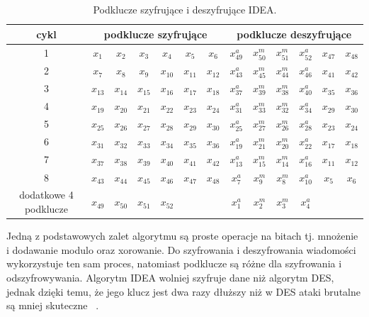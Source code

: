 \documentclass[12p]{article}
\begin{document}
\begin{table}[H]
\centering
\begin{tabular}{|c|c|c|c|c|c|c|c|c|c|c|c|c|}
\hline
cykl & \multicolumn{6}{|c|}{podklucze szyfrujące}  & \multicolumn{6}{|c|}{podklucze deszyfrujące} \\ \hline
1&$x_{1}$&$x_{2}$&$x_{3}$&$x_{4}$&$x_{5}$&$x_{6}$&$x_{49}^{a}$&$x_{50}^{m}$&$x_{51}^{m}$&$x_{52}^{a}$&$x_{47}$&$x_{48}$\\ \hline
2&$x_{7}$&$x_{8}$&$x_{9}$&$x_{10}$&$x_{11}$& $x_{12}$&$x_{43}^{a}$&$x_{45}^{m}$&$x_{44}^{m}$&$x_{46}^{a}$&$x_{41}$&$x_{42}$\\ \hline
3&$x_{13}$&$x_{14}$&$x_{15}$&$x_{16}$&$x_{17}$&$x_{18}$&$x_{37}^{a}$&$x_{39}^{m}$&$x_{38}^{m}$&$x_{40}^{a}$&$x_{35}$&$x_{36}$\\ \hline
4&$x_{19}$&$x_{20}$&$x_{21}$&$x_{22}$&$x_{23}$&$x_{24}$&$x_{31}^{a}$&$x_{33}^{m}$&$x_{32}^{m}$&$x_{34}^{a}$&$x_{29}$&$x_{30}$\\ \hline
5&$x_{25}$&$x_{26}$&$x_{27}$&$x_{28}$&$x_{29}$&$x_{30}$&$x_{25}^{a}$&$x_{27}^{m}$&$x_{26}^{m}$&$x_{28}^{a}$&$x_{23}$&$x_{24}$\\ \hline
6&$x_{31}$&$x_{32}$&$x_{33}$&$x_{34}$&$x_{35}$&$x_{36}$&$x_{19}^{a}$&$x_{21}^{m}$&$x_{20}^{m}$&$x_{22}^{a}$&$x_{17}$&$x_{18}$\\ \hline
7&$x_{37}$&$x_{38}$&$x_{39}$&$x_{40}$&$x_{41}$&$x_{42}$&$x_{13}^{a}$&$x_{15}^{m}$&$x_{14}^{m}$&$x_{16}^{a}$&$x_{11}$&$x_{12}$\\ \hline
8&$x_{43}$&$x_{44}$&$x_{45}$&$x_{46}$&$x_{47}$&$x_{48}$&$x_{7}^{a}$&$x_{9}^{m}$&$x_{8}^{m}$&$x_{10}^{a}$&$x_{5}$&$x_{6}$\\ \hline
dodatkowe 4 podklucze&$x_{49}$&$x_{50}$&$x_{51}$&$x_{52}$&&&$x_{1}^{a}$&$x_{2}^{m}$&$x_{3}^{m}$&$x_{4}^{a}$&&\\ \hline
\end{tabular}
\caption{Podklucze szyfrujące i deszyfrujące IDEA.}\label{podklucze_deszyfrowania_idea}
\end{table}

Jedną z podstawowych zalet algorytmu są proste operacje na bitach tj. mnożenie i dodawanie modulo oraz xorowanie. Do szyfrowania i deszyfrowania wiadomości wykorzystuje ten sam proces, natomiast podklucze są różne dla szyfrowania i odszyfrowywania. Algorytm IDEA wolniej szyfruje dane niż algorytm DES, jednak dzięki temu, że jego klucz jest dwa razy dłuższy niż w DES ataki brutalne są mniej skuteczne ~\cite{IDEA}.

\end{document}
